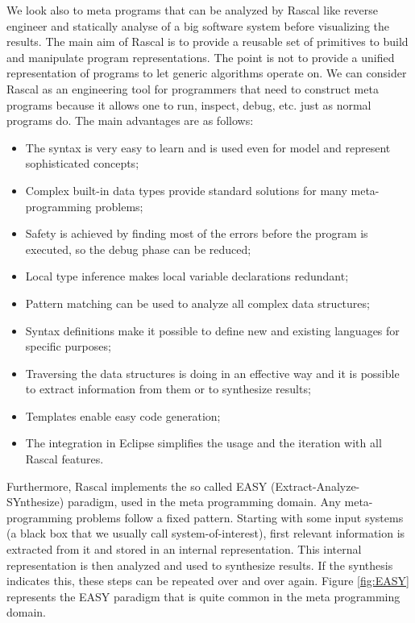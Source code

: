 We look also to meta programs that can be analyzed by Rascal like reverse engineer and statically analyse of a big software system before visualizing the results. The main aim of Rascal is to provide a reusable set of primitives to build and manipulate program representations. The point is not to provide a unified representation of programs to let generic algorithms operate on. We can consider Rascal as an engineering tool for programmers that need to construct meta programs because it allows one to run, inspect, debug, etc. just as normal programs do. The main advantages are as follows:


\begin{itemize}
\item The syntax is very easy to learn and is used even for model and represent sophisticated concepts;
\item Complex built-in data types provide standard solutions for many meta-programming problems;
\item Safety is achieved by finding most of the errors before the program is executed, so the debug phase can be reduced;
\item Local type inference makes local variable declarations redundant;
\item Pattern matching can be used to analyze all complex data structures;
\item Syntax definitions make it possible to define new and existing languages for specific purposes;
\item Traversing the data structures is doing in an effective way and it is possible to extract information from them or to synthesize results;
\item Templates enable easy code generation;
\item The integration in Eclipse simplifies the usage and the iteration with all Rascal features.
\end{itemize}


Furthermore, Rascal implements the so called EASY (Extract-Analyze-SYnthesize) paradigm, used in the meta programming domain. Any meta-programming problems follow a fixed pattern. Starting with some input systems (a black box that we usually call system-of-interest), first relevant information is extracted from it and stored in an internal representation. This internal representation is then analyzed and used to synthesize results. If the synthesis indicates this, these steps can be repeated over and over again. Figure \ref{fig:EASY} represents the EASY paradigm that is quite common in the meta programming domain.


